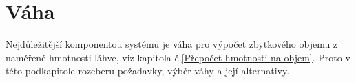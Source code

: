
\section{Váha}

Nejdůležitější komponentou systému je váha pro výpočet zbytkového objemu z naměřené hmotnosti láhve, viz kapitola č.\ref{Přepočet hmotnosti na objem}.  Proto v této podkapitole rozeberu požadavky, výběr váhy a její alternativy.
%
%
%
%
%
%
%
%
